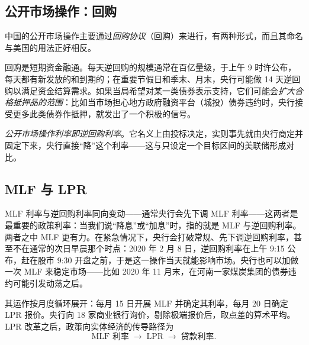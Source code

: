 \subsection{公开市场操作：回购}

中国的公开市场操作主要通过\emph{回购协议}（回购）来进行，有两种形式，而且其命名与美国的用法正好相反。


回购是短期资金融通。每天逆回购的规模通常在百亿量级，于上午 9 时许公布，每天都有新发放的和到期的；在重要节假日和季末、月末，央行可能做 14 天逆回购以满足资金结算需求。如果当局希望对某一类债券表示支持，它们可能会\emph{扩大合格抵押品的范围}：比如当市场担心地方政府融资平台（城投）债券违约时，央行接受更多此类债券作抵押，就发出了一个积极的信号。

\emph{公开市场操作利率即逆回购利率}。它名义上由投标决定，实则事先就由央行商定并固定下来，央行直接“降”这个利率——这与只设定一个目标区间的美联储形成对比。

\subsection{MLF 与 LPR}


MLF 利率与逆回购利率同向变动——通常央行会先下调 MLF 利率——这两者是最重要的政策利率：当我们说“降息”或“加息”时，指的就是 MLF 与逆回购利率。两者之中 MLF 更有力。在紧急情况下，央行会打破常规、先下调逆回购利率，甚至不在通常的次日早晨那个时点：2020 年 2 月 8 日，逆回购利率在上午 9:15 公布，赶在股市 9:30 开盘之前，于是这一操作当天就能影响市场。央行也可以加做一次 MLF 来稳定市场——比如 2020 年 11 月末，在河南一家煤炭集团的债券违约可能引发动荡之后。


其运作按月度循环展开：每月 15 日开展 MLF 并确定其利率，每月 20 日确定 LPR 报价。央行向 18 家商业银行询价，剔除极端报价后，取点差的算术平均。LPR 改革之后，政策向实体经济的传导路径为
\[
\text{MLF 利率} \;\to\; \text{LPR} \;\to\; \text{贷款利率}.
\]

